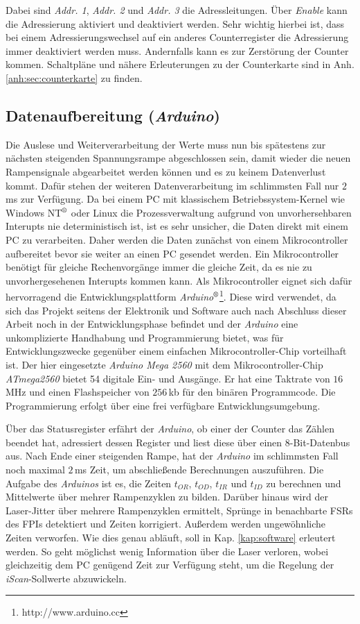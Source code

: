 Dabei sind \textit{Addr. 1}, \textit{Addr. 2} und \textit{Addr. 3} die
Adressleitungen. Über \textit{Enable} kann die Adressierung aktiviert und
deaktiviert werden. Sehr wichtig hierbei ist, dass bei einem Adressierungswechsel auf ein anderes
Counterregister die Adressierung immer deaktiviert werden muss. Andernfalls kann
es zur Zerstörung der Counter kommen. Schaltpläne und nähere Erleuterungen
zu der Counterkarte sind in Anh. \ref{anh:sec:counterkarte} zu finden.

\subsection{Datenaufbereitung (\textit{Arduino})}\label{subsec:arduino}
Die Auslese und Weiterverarbeitung der Werte muss nun bis spätestens zur
nächsten steigenden Spannungsrampe abgeschlossen sein, damit wieder die neuen
Rampensignale abgearbeitet werden können und es zu keinem Datenverlust kommt.
Dafür stehen der weiteren Datenverarbeitung im schlimmsten Fall nur $2\,$ms zur
Verfügung. Da bei einem PC mit klassischem Betriebssystem-Kernel wie Windows
NT$^\text{\textregistered}$ oder Linux die Prozessverwaltung aufgrund von
unvorhersehbaren Interupts nie deterministisch ist, ist es sehr unsicher, die Daten direkt mit einem PC zu
verarbeiten. Daher werden die Daten zunächst von einem Mikrocontroller
aufbereitet bevor sie weiter an einen PC gesendet werden. Ein Mikrocontroller
benötigt für gleiche Rechenvorgänge immer die gleiche Zeit, da es nie zu
unvorhergesehenen Interupts kommen kann. Als Mikrocontroller eignet sich dafür
hervorragend die Entwicklungsplattform \textit{Arduino$^\text{\textregistered}$}\footnote{http://www.arduino.cc}. Diese
wird verwendet, da sich das Projekt seitens der Elektronik und Software
auch nach Abschluss dieser Arbeit noch in der Entwicklungsphase befindet und der \textit{Arduino} eine unkomplizierte Handhabung
und Programmierung bietet, was für Entwicklungszwecke gegenüber einem einfachen
Mikrocontroller-Chip vorteilhaft ist. Der hier eingesetzte
\textit{Arduino Mega 2560} mit dem Mikrocontroller-Chip \textit{ATmega2560}
bietet 54 digitale Ein- und Ausgänge. Er hat eine Taktrate von $16\,$MHz und
einen Flashspeicher von $256\,$kb für den binären Programmcode.
Die Programmierung erfolgt über eine frei verfügbare Entwicklungsumgebung.\par
Über das Statusregister erfährt der \textit{Arduino}, ob einer der Counter das Zählen
beendet hat, adressiert dessen Register und liest diese über einen
8-Bit-Datenbus aus. Nach Ende einer steigenden Rampe, hat der \textit{Arduino} im
schlimmsten Fall noch maximal $2\,$ms Zeit, um abschließende Berechnungen
auszuführen. Die Aufgabe des \textit{Arduinos} ist es, die Zeiten $t_{OR}$,
$t_{OD}$, $t_{IR}$ und $t_{ID}$ zu berechnen und Mittelwerte über mehrer Rampenzyklen zu
bilden. Darüber hinaus wird der Laser-Jitter über mehrere Rampenzyklen
ermittelt, Sprünge in benachbarte FSRs des FPIs detektiert und Zeiten
korrigiert. Außerdem werden ungewöhnliche Zeiten verworfen. Wie dies genau
abläuft, soll in Kap. \ref{kap:software} erleutert werden. So geht möglichst
wenig Information über die Laser verloren, wobei gleichzeitig dem PC genügend
Zeit zur Verfügung steht, um die Regelung der \textit{iScan}-Sollwerte
abzuwickeln.

